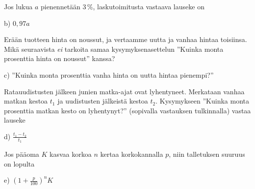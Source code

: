 \begin{tehtava}
Jos lukua $a$ pienennetään $3$\,\%, laskutoimitusta vastaava lauseke on
	\begin{vastaus}
b) $0,97a$
	\end{vastaus}
\end{tehtava}

\begin{tehtava}
Erään tuotteen hinta on noussut, ja vertaamme uutta ja vanhaa hintaa toisiinsa. Mikä seuraavista \textit{ei} tarkoita samaa kysymyksenasettelun ''Kuinka monta prosenttia hinta on noussut'' kanssa?
	\begin{vastaus}
c) ''Kuinka monta prosenttia vanha hinta on uutta hintaa pienempi?''
	\end{vastaus}
\end{tehtava}

\begin{tehtava}
Ratauudistusten jälkeen junien matka-ajat ovat lyhentyneet. Merkataan vanhaa matkan kestoa $t_1$ ja uudistusten jälkeistä kestoa $t_2$. Kysymykseen ''Kuinka monta prosenttia matkan kesto on lyhentynyt?'' (sopivalla vastauksen tulkinnalla) vastaa lauseke
	\begin{vastaus}
d) $\frac{t_1-t_2}{t_1}$
	\end{vastaus}
\end{tehtava}

\begin{tehtava}
Jos pääoma $K$ kasvaa korkoa $n$ kertaa korkokannalla $p$, niin talletuksen suuruus on lopulta
	\begin{vastaus}
e) $(1+\frac{p}{100})^nK$
	\end{vastaus}
\end{tehtava}



